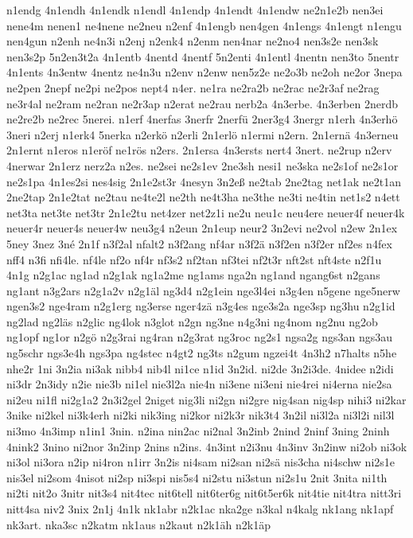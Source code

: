 {n1endg
4n1endh
4n1endk
n1endl
4n1endp
4n1endt
4n1endw
ne2n1e2b
nen3ei
nene4m
nenen1
ne4nene
ne2neu
n2enf
4n1engb
nen4gen
4n1engs
4n1engt
n1engu
nen4gun
n2enh
ne4n3i
n2enj
n2enk4
n2enm
nen4nar
ne2no4
nen3s2e
nen3sk
nen3s2p
5n2en3t2a
4n1entb
4nentd
4nentf
5n2enti
4n1entl
4nentn
nen3to
5nentr
4n1ents
4n3entw
4nentz
ne4n3u
n2env
n2enw
nen5z2e
ne2o3b
ne2oh
ne2or
3nepa
ne2pen
2nepf
ne2pi
ne2pos
nept4
n4er.
ne1ra
ne2ra2b
ne2rac
ne2r3af
ne2rag
ne3r4al
ne2ram
ne2ran
ne2r3ap
n2erat
ne2rau
nerb2a
4n3erbe.
4n3erben
2nerdb
ne2re2b
ne2rec
5nerei.
n1erf
4nerfas
3nerfr
2nerfü
2ner3g4
3nergr
n1erh
4n3erhö
3neri
n2erj
n1erk4
5nerka
n2erkö
n2erli
2n1erlö
n1ermi
n2ern.
2n1ernä
4n3erneu
2n1ernt
n1eros
n1eröf
ne1rös
n2ers.
2n1ersa
4n3ersts
nert4
3nert.
ne2rup
n2erv
4nerwar
2n1erz
nerz2a
n2es.
ne2sei
ne2s1ev
2ne3sh
nesi1
ne3ska
ne2s1of
ne2s1or
ne2s1pa
4n1es2si
nes4sig
2n1e2st3r
4nesyn
3n2eß
ne2tab
2ne2tag
net1ak
ne2t1an
2ne2tap
2n1e2tat
ne2tau
ne4te2l
ne2th
ne4t3ha
ne3the
ne3ti
ne4tin
net1s2
n4ett
net3ta
net3te
net3tr
2n1e2tu
net4zer
net2z1i
ne2u
neu1c
neu4ere
neuer4f
neuer4k
neuer4r
neuer4s
neuer4w
neu3g4
n2eun
2n1eup
neur2
3n2evi
ne2vol
n2ew
2n1ex
5ney
3nez
3né
2n1f
n3f2al
nfalt2
n3f2ang
nf4ar
n3f2ä
n3f2en
n3f2er
nf2es
n4fex
nff4
n3fi
nfi4le.
nf4le
nf2o
nf4r
nf3s2
nf2tan
nf3tei
nf2t3r
nft2st
nft4ste
n2f1u
4n1g
n2g1ac
ng1ad
n2g1ak
ng1a2me
ng1ams
nga2n
ng1and
ngang6st
n2gans
ng1ant
n3g2ars
n2g1a2v
n2g1äl
ng3d4
n2g1ein
nge3l4ei
n3g4en
n5gene
nge5nerw
ngen3s2
nge4ram
n2g1erg
ng3erse
nger4zä
n3g4es
nge3s2a
nge3sp
ng3hu
n2g1id
ng2lad
ng2läs
n2glic
ng4lok
n3glot
n2gn
ng3ne
n4g3ni
ng4nom
ng2nu
ng2ob
ng1opf
ng1or
n2gö
n2g3rai
ng4ran
n2g3rat
ng3roc
ng2s1
ngsa2g
ngs3an
ngs3au
ng5schr
ngs3e4h
ngs3pa
ng4stec
n4gt2
ng3ts
n2gum
ngzei4t
4n3h2
n7halts
n5he
nhe2r
1ni
3n2ia
ni3ak
nibb4
nib4l
ni1ce
n1id
3n2id.
ni2de
3n2i3de.
4nidee
n2idi
ni3dr
2n3idy
n2ie
nie3b
ni1el
nie3l2a
nie4n
ni3ene
ni3eni
nie4rei
ni4erna
nie2sa
ni2eu
ni1fl
ni2g1a2
2n3i2gel
2niget
nig3li
ni2gn
ni2gre
nig4san
nig4sp
nihi3
ni2kar
3nike
ni2kel
ni3k4erh
ni2ki
nik3ing
ni2kor
ni2k3r
nik3t4
3n2il
ni3l2a
ni3l2i
nil3l
ni3mo
4n3imp
n1in1
3nin.
n2ina
nin2ac
ni2nal
3n2inb
2nind
2ninf
3ning
2ninh
4nink2
3nino
ni2nor
3n2inp
2nins
n2ins.
4n3int
n2i3nu
4n3inv
3n2inw
ni2ob
ni3ok
ni3ol
ni3ora
n2ip
ni4ron
n1irr
3n2is
ni4sam
ni2san
ni2sä
nis3cha
ni4schw
ni2s1e
nis3el
ni2som
4nisot
ni2sp
ni3spi
nis5s4
ni2stu
ni3stun
ni2s1u
2nit
3nita
ni1th
ni2ti
nit2o
3nitr
nit3s4
nit4tec
nit6tell
nit6ter6g
nit6t5er6k
nit4tie
nit4tra
nitt3ri
nitt4sa
niv2
3nix
2n1j
4n1k
nk1abr
n2k1ac
nka2ge
n3kal
n4kalg
nk1ang
nk1apf
nk3art.
nka3sc
n2katm
nk1aus
n2kaut
n2k1äh
n2k1äp
}
